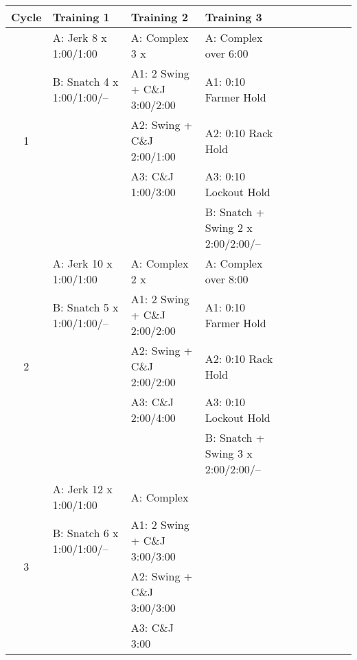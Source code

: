 \documentclass[a4paper,11pt,oneside]{article}
\begin{document}
\newpage
\begin{tabular}{clllllllll}

Cycle & Training 1 & Training 2 & Training 3 \\

\hline

\multirow{5}{*}{1} 	& A: Jerk 8 x 1:00/1:00 		& A: Complex 3 x 					& A: Complex over 6:00 \\
				 	& B: Snatch 4 x 1:00/1:00/-- 	& A1: 2 Swing + C\&J 3:00/2:00 		& A1: 0:10 Farmer Hold \\
  					&								& A2: Swing + C\&J 2:00/1:00		& A2: 0:10 Rack Hold \\
  					&								& A3: C\&J 1:00/3:00 				& A3: 0:10 Lockout Hold \\
  					&								&									& B: Snatch + Swing 2 x 2:00/2:00/-- \\

\hline

\multirow{5}{*}{2} 	& A: Jerk 10 x 1:00/1:00 		& A: Complex 2 x 					& A: Complex over 8:00 \\
					& B: Snatch 5 x 1:00/1:00/-- 	& A1: 2 Swing + C\&J 2:00/2:00 		& A1: 0:10 Farmer Hold \\
  					& 								& A2: Swing + C\&J 2:00/2:00		& A2: 0:10 Rack Hold \\
  					& 								& A3: C\&J 2:00/4:00 				& A3: 0:10 Lockout Hold \\
  					&								&									& B: Snatch + Swing 3 x 2:00/2:00/-- \\

\hline

\multirow{4}{*}{3} 	& A: Jerk 12 x 1:00/1:00 		& A: Complex \\
					& B: Snatch 6 x 1:00/1:00/-- 	& A1: 2 Swing + C\&J 3:00/3:00 \\
  					& 								& A2: Swing + C\&J 3:00/3:00 \\
  					& 								& A3: C\&J 3:00 \\

\hline
\end{tabular}
\end{document}
